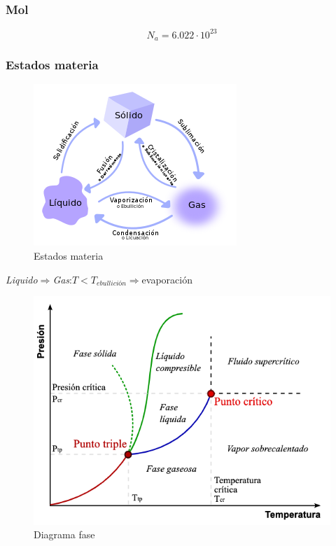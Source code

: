\documentclass[a4paper,12pt]{article}
\begin{document}
\subsubsection{Mol}
\begin{equation}
    N_a=6.022\cdot10^{23}
\end{equation}
\subsubsection{Estados materia}
\begin{figure}[H]
    \centering
    \includegraphics{Imagenes/QUIM/290px-Estados.png}
    \caption{Estados materia}
    \label{fig:estadosmateria}
\end{figure}
\emph{Liquido$\Rightarrow$Gas}:$T<T_{{ebullición}}\Rightarrow$evaporación
\begin{figure}[H]
    \centering
    \includegraphics[width=\textwidth]{Imagenes/QUIM/Phase-diag_es.png}
    \caption{Diagrama fase}
\end{figure}
\end{document}

